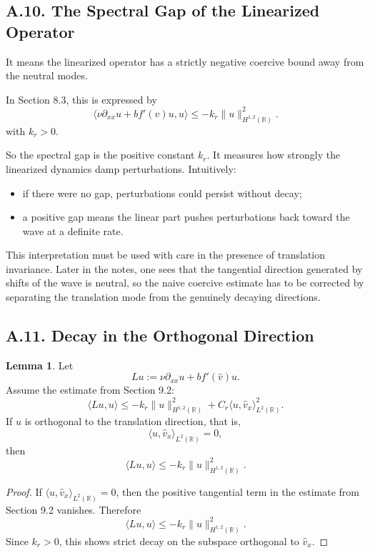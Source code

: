\documentclass[11pt]{article}
\theoremstyle{definition}
\newtheorem{lemma}{Lemma}
\theoremstyle{remark}
\begin{document}
\subsection*{A.10. The Spectral Gap of the Linearized Operator}
It means the linearized operator has a strictly negative coercive bound away from the neutral modes.

In Section 8.3, this is expressed by
\[
\langle \nu\partial_{xx}u+b f'(\hat v)u,u\rangle
\leq
-k_r\|u\|_{H^{1,2}(\mathbb R)}^2.
\]
with $k_r>0$.

So the spectral gap is the positive constant $k_r$. It measures how strongly the linearized dynamics damp perturbations. Intuitively:
\begin{itemize}
\item if there were no gap, perturbations could persist without decay;
\item a positive gap means the linear part pushes perturbations back toward the wave at a definite rate.
\end{itemize}

This interpretation must be used with care in the presence of translation invariance. Later in the notes, one sees that the tangential direction generated by shifts of the wave is neutral, so the naive coercive estimate has to be corrected by separating the translation mode from the genuinely decaying directions.

\subsection*{A.11. Decay in the Orthogonal Direction}
\begin{lemma}
Let
\[
Lu:=\nu\partial_{xx}u+b f'(\hat v)u.
\]
Assume the estimate from Section 9.2:
\[
\langle Lu,u\rangle
\le
-k_r\|u\|_{H^{1,2}(\mathbb R)}^2
+C_r\langle u,\hat v_x\rangle_{L^2(\mathbb R)}^2.
\]
If $u$ is orthogonal to the translation direction, that is,
\[
\langle u,\hat v_x\rangle_{L^2(\mathbb R)}=0,
\]
then
\[
\langle Lu,u\rangle
\le
-k_r\|u\|_{H^{1,2}(\mathbb R)}^2.
\]
\end{lemma}

\begin{proof}
If $\langle u,\hat v_x\rangle_{L^2(\mathbb R)}=0$, then the positive tangential term in the estimate from Section 9.2 vanishes. Therefore
\[
\langle Lu,u\rangle
\le
-k_r\|u\|_{H^{1,2}(\mathbb R)}^2.
\]
Since $k_r>0$, this shows strict decay on the subspace orthogonal to $\hat v_x$.
\end{proof}
\end{document}
